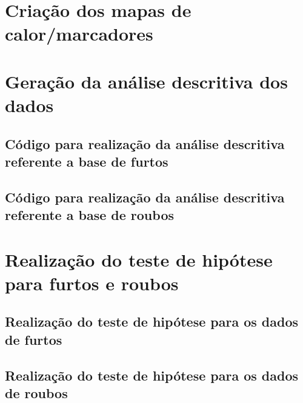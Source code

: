 \documentclass[
	12pt,
	openright,			%
	twoside,			%
	a4paper,			%
	chapter=TITLE,		%
	section=TITLE,		%
	subsection=TITLE,	%
	subsubsection=TITLE,%
	english,			%
	french,				%
	spanish,			%
	brazil				%
	]{abntex2}
\begin{document}
\begin{anexosenv}
\chapter{Criação dos mapas de calor/marcadores}


\chapter{Geração da análise descritiva dos dados}
\section{Código para realização da análise descritiva referente a base de furtos}


\section{Código para realização da análise descritiva referente a base de roubos}


\chapter{Realização do teste de hipótese para furtos e roubos}
\section{Realização do teste de hipótese para os dados de furtos}


\section{Realização do teste de hipótese para os dados de roubos}

\end{anexosenv}
\end{document}
